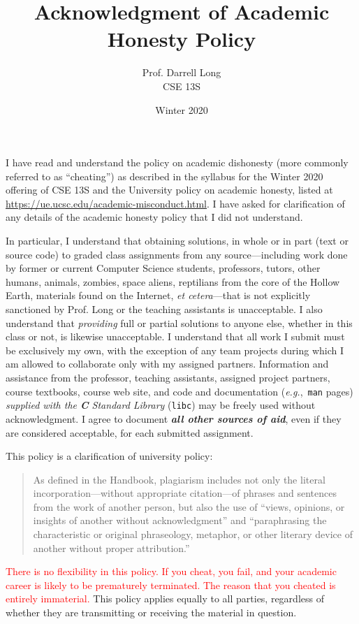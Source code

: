 \documentclass{article}
\title{Acknowledgment of Academic Honesty Policy}
\author{Prof.\xspace Darrell Long \\
CSE 13S}
\date{Winter 2020}
\newcommand{\surl}[1]{{\fontsize{9}{11}\selectfont\url{#1}}}
\begin{document}
\maketitle
I have read and understand the policy on academic dishonesty (more
commonly referred to as ``cheating'') as described in the syllabus
for the Winter 2020 offering of CSE 13S 
and the University policy on academic honesty, listed at
\surl{https://ue.ucsc.edu/academic-misconduct.html}.  I have asked for
clarification of any details of the academic honesty policy that I
did not understand.

In particular, I understand that obtaining solutions, in whole or
in part (text or source code) to graded class assignments from any
source---including work done by former or current Computer Science
students, professors, tutors, other humans, animals, zombies, space
aliens, reptilians from the core of the Hollow Earth,
materials found on the Internet, \emph{et cetera}---that
is not explicitly sanctioned by Prof.\xspace Long or the teaching assistants is unacceptable.
I also understand that \emph{providing} full or partial solutions
to anyone else, whether in this class or not, is likewise unacceptable.
I understand that all work I submit must be exclusively my own,
with the exception of any team projects during which I am allowed
to collaborate only with my assigned partners.  Information and
assistance from the professor, teaching assistants, assigned project partners, course
textbooks, course web site, and code and documentation
(\emph{e.g.},~\texttt{man} pages) \emph{supplied with the \textbf{C} Standard
Library} (\texttt{libc})
may be freely used without acknowledgment.  I agree to document
\textbf{\emph{all other sources of aid}}, even if they are considered
acceptable, for each submitted assignment.

This policy is a clarification of university policy:
\begin{quote}
As defined in the Handbook, plagiarism includes not only the literal
incorporation---without appropriate citation---of phrases and
sentences from the work of another person, but also the use of
``views, opinions, or insights of another without acknowledgment''
and ``paraphrasing the characteristic or original phraseology,
metaphor, or other literary device of another without proper
attribution.''
\end{quote}


\textcolor{red}{There is no flexibility in this policy. If you
cheat, you fail, and your academic career is likely to be prematurely
terminated. The reason that you cheated is entirely immaterial.}
This policy applies equally to all parties, regardless of whether
they are transmitting or receiving the material in question.
\end{document}
